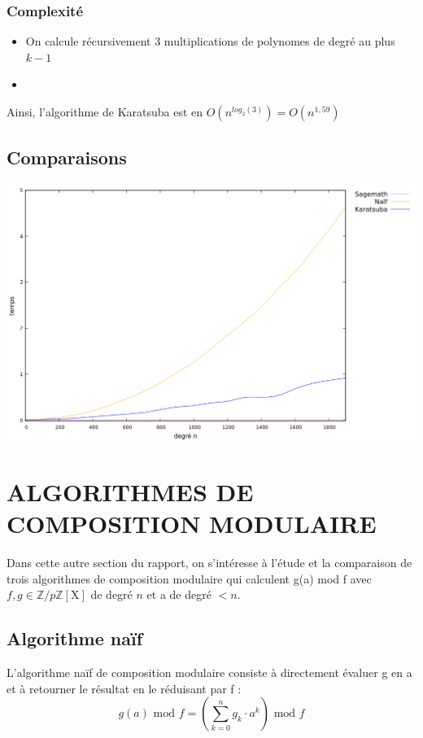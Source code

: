 \documentclass[a4paper]{article}
\begin{document}
\subsubsection*{Complexité}
\begin{itemize}
    \item On calcule récursivement 3 multiplications de polynomes de degré au plus $k-1$
    \item 
\end{itemize}
Ainsi, l'algorithme de Karatsuba est en $O(n^{log_2(3)}) = O(n^{1,59})$

\subsection{Comparaisons}

\includegraphics[scale=0.5, center]{multi.png}

\section{ALGORITHMES DE COMPOSITION MODULAIRE}

Dans cette autre section du rapport, on s'intéresse à l'étude et la comparaison de trois algorithmes de composition modulaire qui calculent g(a) mod f avec 
$f,g \in \mathbb{Z}/p\mathbb{Z}[\mathrm{X}]$ de degré $n$ et a de degré $< n$.



\subsection{Algorithme naïf}

L'algorithme naïf de composition modulaire consiste à directement évaluer g en a et à retourner le résultat en le réduisant par f :
\[
g(a)\text{ mod }f = \left(\sum_{k=0}^n g_k \cdot a^k\right) \text{ mod }f    
\]
\end{document}
